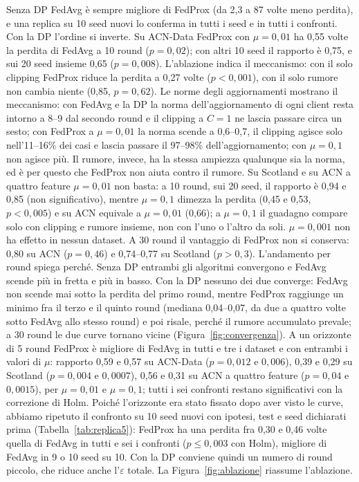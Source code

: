 Senza DP FedAvg è sempre migliore di FedProx (da 2,3 a 87 volte meno perdita), e una replica
su 10 seed nuovi lo conferma in tutti i seed e in tutti i confronti. Con la DP l'ordine si
inverte. Su ACN-Data FedProx con $\mu=0{,}01$ ha 0,55 volte la perdita di FedAvg a 10 round
($p=0{,}02$); con altri 10 seed il rapporto è 0,75, e sui 20 seed insieme 0,65 ($p=0{,}008$). L'ablazione indica il meccanismo: con il solo clipping FedProx riduce la perdita
a 0,27 volte ($p<0{,}001$), con il solo rumore non cambia niente (0,85, $p=0{,}62$). Le norme degli aggiornamenti
mostrano il meccanismo: con FedAvg e la DP la norma dell'aggiornamento di ogni client resta
intorno a 8--9 dal secondo round e il clipping a $C=1$ ne lascia passare circa un sesto; con
FedProx a $\mu=0{,}01$ la norma scende a 0,6--0,7, il clipping agisce solo nell'11--16\% dei
casi e lascia passare il 97--98\% dell'aggiornamento; con $\mu=0{,}1$ non agisce più. Il
rumore, invece, ha la stessa ampiezza qualunque sia la norma, ed è per questo che FedProx non
aiuta contro il rumore. Su Scotland e su ACN a quattro feature $\mu=0{,}01$ non basta: a 10
round, sui 20 seed, il rapporto è 0,94 e 0,85 (non significativo), mentre $\mu=0{,}1$ dimezza
la perdita (0,45 e 0,53, $p<0{,}005$) e su ACN equivale a $\mu=0{,}01$ (0,66); a $\mu=0{,}1$ il
guadagno compare solo con clipping e rumore insieme, non con l'uno o l'altro da soli.
$\mu=0{,}001$ non ha effetto in nessun dataset. A 30 round il vantaggio di FedProx non si
conserva: 0,80 su ACN ($p=0{,}46$) e 0,74--0,77 su Scotland ($p>0{,}3$).
L'andamento per round spiega perché. Senza DP entrambi gli algoritmi convergono e FedAvg
scende più in fretta e più in basso. Con la DP nessuno dei due converge: FedAvg non scende mai
sotto la perdita del primo round, mentre FedProx raggiunge un minimo fra il terzo e il quinto
round (mediana 0,04--0,07, da due a quattro volte sotto FedAvg allo stesso round) e poi risale,
perché il rumore accumulato prevale; a 30 round le due curve tornano vicine
(Figura~\ref{fig:convergenza}). A un orizzonte di 5 round FedProx è migliore di FedAvg in tutti e
tre i dataset e con entrambi i valori di $\mu$: rapporto 0,59 e 0,57 su ACN-Data ($p=0{,}012$ e
$0{,}006$), 0,39 e 0,29 su Scotland ($p=0{,}004$ e $0{,}0007$), 0,56 e 0,31 su ACN a quattro
feature ($p=0{,}04$ e $0{,}0015$), per $\mu=0{,}01$ e $\mu=0{,}1$; tutti i sei confronti restano
significativi con la correzione di Holm. Poiché l'orizzonte era stato fissato dopo aver visto le
curve, abbiamo ripetuto il confronto su 10 seed nuovi con ipotesi, test e seed dichiarati prima
(Tabella~\ref{tab:replica5}): FedProx ha una perdita fra 0,30 e 0,46 volte quella di FedAvg in
tutti e sei i confronti ($p\le0{,}003$ con Holm), migliore di FedAvg in 9 o 10 seed su 10. Con la
DP conviene quindi un numero di round piccolo, che riduce anche l'$\varepsilon$ totale. La
Figura~\ref{fig:ablazione} riassume l'ablazione.

